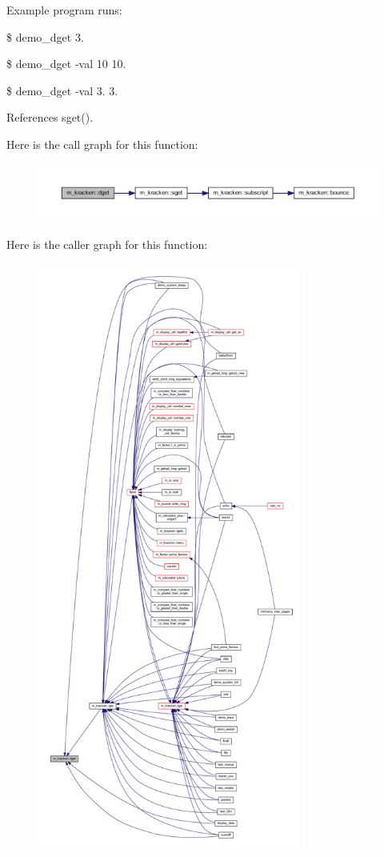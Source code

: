 Example program runs\+:

\$ demo\+\_\+dget 3.

\$ demo\+\_\+dget -\/val 10 10.

\$ demo\+\_\+dget -\/val 3. 3. 

References sget().

Here is the call graph for this function\+:
\nopagebreak
\begin{figure}[H]
\begin{center}
\leavevmode
\includegraphics[width=350pt]{namespacem__kracken_ae7b6ad046d637f03148efb56336a7ff4_cgraph}
\end{center}
\end{figure}
Here is the caller graph for this function\+:
\nopagebreak
\begin{figure}[H]
\begin{center}
\leavevmode
\includegraphics[height=550pt]{namespacem__kracken_ae7b6ad046d637f03148efb56336a7ff4_icgraph}
\end{center}
\end{figure}
\mbox{\label{namespacem__kracken_a76e99048e7fb6010dcb7173ef958c932}} 
